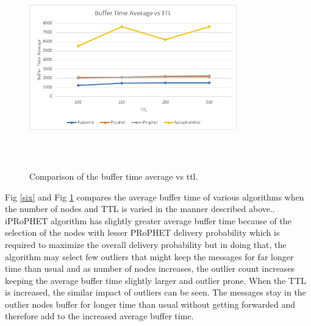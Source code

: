 \documentclass[10pt,journal]{IEEEtran}
\begin{document}
\begin{figure}[H]
	\centering
	\includegraphics[width=9cm, height=8cm]{buf_time_vs_ttl.png}\\
	\caption{Comparison of the buffer time average vs ttl.}
	\label{three}
\end{figure}

Fig \ref{six} and Fig \ref{three} compares the average buffer time of various algorithms when the number of nodes and TTL is varied in the manner described above.. iPRoPHET algorithm has slightly greater average buffer time because of the selection of the nodes with lesser PRoPHET delivery probability which is required to maximize the overall delivery probability but in doing that, the algorithm may select few outliers that might keep the messages for far longer time than usual and as number of nodes increases, the outlier count increases keeping the average buffer time slightly larger and outlier prone. 
When the TTL is increased, the similar impact of outliers can be seen. The messages stay in the outlier nodes buffer for longer time than usual without getting forwarded and therefore add to the increased average buffer time.
\end{document}
